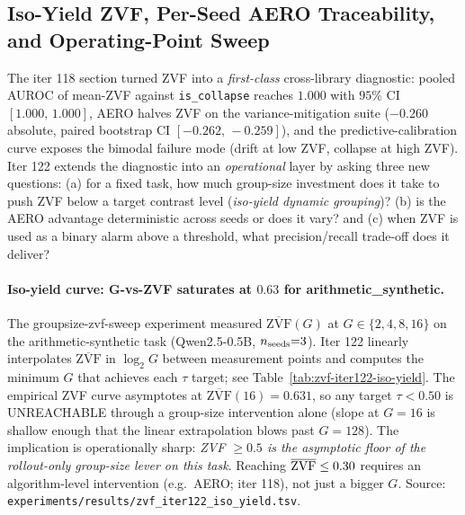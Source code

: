 
\subsection{Iso-Yield ZVF, Per-Seed AERO Traceability, and Operating-Point Sweep}
\label{sec:zvf-iso-yield-iter122}

The iter 118 section turned ZVF into a \emph{first-class}
cross-library diagnostic: pooled AUROC of mean-ZVF against
\texttt{is\_collapse} reaches $1.000$ with $95\%$ CI $[1.000,\,1.000]$,
AERO halves ZVF on the variance-mitigation suite ($-0.260$
absolute, paired bootstrap CI $[-0.262,\,-0.259]$), and the
predictive-calibration curve exposes the bimodal failure mode
(drift at low ZVF, collapse at high ZVF). Iter 122 extends the
diagnostic into an \emph{operational} layer by asking three new
questions: (a) for a fixed task, how much group-size investment
does it take to push ZVF below a target contrast level
(\emph{iso-yield dynamic grouping})? (b) is the AERO advantage
deterministic across seeds or does it vary? and (c) when ZVF is
used as a binary alarm above a threshold, what precision/recall
trade-off does it deliver?

\paragraph{Iso-yield curve: G-vs-ZVF saturates at $0.63$ for arithmetic\_synthetic.}
The groupsize-zvf-sweep experiment measured
$\overline{\mathrm{ZVF}}(G)$ at $G \in \{2, 4, 8, 16\}$ on the arithmetic-synthetic
task (Qwen2.5-0.5B, $n_{\rm seeds}{=}3$). Iter 122 linearly
interpolates $\overline{\mathrm{ZVF}}$ in $\log_2 G$ between measurement points
and computes the minimum $G$ that achieves each $\tau$ target;
see Table~\ref{tab:zvf-iter122-iso-yield}. The empirical ZVF curve
asymptotes at $\overline{\mathrm{ZVF}}(16) = 0.631$, so any target $\tau < 0.50$
is UNREACHABLE through a group-size intervention alone (slope at
$G{=}16$ is shallow enough that the linear extrapolation blows
past $G{=}128$). The implication is operationally sharp: \emph{ZVF
$\ge 0.5$ is the asymptotic floor of the rollout-only group-size
lever on this task}. Reaching $\overline{\mathrm{ZVF}} \le 0.30$ requires an
algorithm-level intervention (e.g.\ AERO; iter 118), not just a
bigger $G$. Source:
\texttt{experiments/results/zvf\_iter122\_iso\_yield.tsv}.

